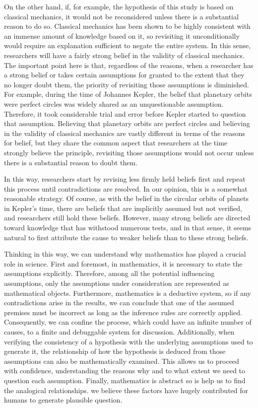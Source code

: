 \documentclass{book}
\begin{document}
On the other hand, if, for example, the hypothesis of this study is based on classical mechanics, it would not be reconsidered unless there is a substantial reason to do so. Classical mechanics has been shown to be highly consistent with an immense amount of knowledge based on it, so revisiting it unconditionally would require an explanation sufficient to negate the entire system. In this sense, researchers will have a fairly strong belief in the validity of classical mechanics. The important point here is that, regardless of the reasons, when a researcher has a strong belief or takes certain assumptions for granted to the extent that they no longer doubt them, the priority of revisiting those assumptions is diminished. For example, during the time of Johannes Kepler, the belief that planetary orbits were perfect circles was widely shared as an unquestionable assumption. Therefore, it took considerable trial and error before Kepler started to question that assumption. Believing that planetary orbits are perfect circles and believing in the validity of classical mechanics are vastly different in terms of the reasons for belief, but they share the common aspect that researchers at the time strongly believe the principle, revisiting those assumptions would not occur unless there is a substantial reason to doubt them.

In this way, researchers start by revising less firmly held beliefs first and repeat this process until contradictions are resolved. In our opinion, this is a somewhat reasonable strategy. Of course, as with the belief in the circular orbits of planets in Kepler's time, there are beliefs that are implicitly assumed but not verified, and researchers still hold these beliefs. However, many strong beliefs are directed toward knowledge that has withstood numerous tests, and in that sense, it seems natural to first attribute the cause to weaker beliefs than to these strong beliefs.

Thinking in this way, we can understand why mathematics has played a crucial role in science. First and foremost, in mathematics, it is necessary to state the assumptions explicitly. Therefore, among all the potential influencing assumptions, only the assumptions under consideration are represented as mathematical objects. Furthermore, mathematics is a deductive system, so if any contradictions arise in the results, we can conclude that one of the assumed premises must be incorrect as long as the inference rules are correctly applied. Consequently, we can confine the process, which could have an infinite number of causes, to a finite and debuggable system for discussion. Additionally, when verifying the consistency of a hypothesis with the underlying assumptions used to generate it, the relationship of how the hypothesis is deduced from those assumptions can also be mathematically examined. This allows us to proceed with confidence, understanding the reasons why and to what extent we need to question each assumption. Finally, mathematics is abstract so is help us to find the analogical relationships. we believe these factors have hugely contributed for humans to generate plausible question.
\end{document}

